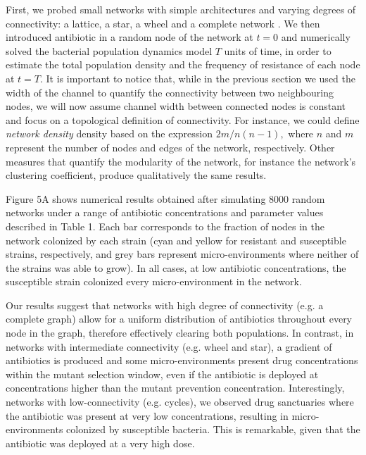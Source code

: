 \documentclass[fleqn,12pt]{wlscirep}
\begin{document}
First, we probed small networks with simple architectures and varying degrees of connectivity: a lattice, a star, a wheel and a complete network \cite{Askari2017}. We then introduced antibiotic in a random node of the network at $t=0$ and numerically solved the bacterial population dynamics model $T$ units of time, in order to estimate the total population density and the frequency of resistance of each node at $t=T$. It is important to notice that, while in the previous section we used the width of the channel to quantify the connectivity between two neighbouring nodes, we will now assume channel width between connected nodes is constant and focus on a topological definition of connectivity. For instance, we could define {\em network density} density based on the expression
${2m}/{n(n-1)},$
where $n$ and $m$ represent the number of nodes and edges of the network, respectively. Other measures that quantify the modularity of the network, for instance the network's clustering coefficient\cite{Opsahl2009}, produce qualitatively the same results. 

Figure 5A shows numerical results obtained after simulating $8000$ random networks under a range of antibiotic concentrations and parameter values described in Table 1. Each bar corresponds to the fraction of nodes in the network colonized by each strain (cyan and yellow for resistant and susceptible strains, respectively, and grey bars represent micro-environments where neither of the strains was able to grow).  In all cases, at low antibiotic concentrations, the susceptible strain colonized every micro-environment in the network.


Our results suggest that networks with high degree of connectivity (e.g. a complete graph) allow for a uniform distribution of antibiotics throughout every node in the graph, therefore effectively clearing both populations.  In contrast, in networks with intermediate connectivity (e.g. wheel and star), a gradient of antibiotics is produced and some micro-environments present drug concentrations within the mutant selection window, even if the antibiotic is deployed at concentrations higher than the mutant prevention concentration.  Interestingly, networks with low-connectivity (e.g. cycles), we observed drug sanctuaries where the antibiotic was present at very low concentrations, resulting in micro-environments colonized by susceptible bacteria. This is remarkable, given that the antibiotic was deployed at a very high dose.
\end{document}
